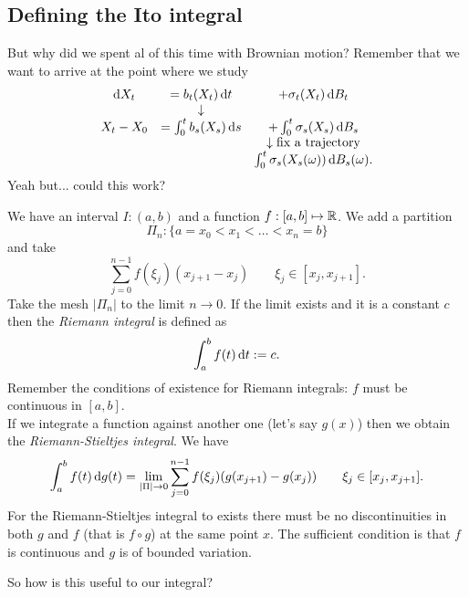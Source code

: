 \documentclass[crop=false, class=article]{standalone}
\begin{document}
\subsection{Defining the Ito integral}
But why did we spent al of this time with Brownian motion? Remember that we want to arrive at the point where we study
\begin{equation*}
	\begin{array}{ccc}
		\mathop{}\!\mathrm{d} X_{t}&=b_{t}(X_{t})\mathop{}\!\mathrm{d} t&+\sigma_{t}(X_{t})\mathop{}\!\mathrm{d} B_{t}\\
		&\downarrow&\\
		X_{t}-X_{0}&=\int_{0}^{t}b_{s}(X_{s})\mathop{}\!\mathrm{d} s&+\int_{0}^{t}\sigma_{s}(X_{s})\mathop{}\!\mathrm{d} B_{s}\\
		&&\downarrow\text{fix a trajectory}\\
		&&\int_{0}^{t}\sigma_{s}(X_{s}(\omega))\mathop{}\!\mathrm{d} B_{s}(\omega).
	\end{array}
\end{equation*}
Yeah but... could this work?
\begin{revise}
	We have an interval $I:(a,b)$ and a function $f:[a,b]\mapsto\mathbb{R}$. We add a partition
	\begin{equation*}
		\Pi_{n}:\{a=x_{0}<x_{1}<\ldots<x_{n}=b\}
	\end{equation*}
	and take
	\begin{equation*}
		\sum_{j=0}^{n-1}f(\xi_j)(x_{j+1}-x_{j})\qquad\xi_{j}\in[x_{j},x_{j+1}].
	\end{equation*}
	Take the mesh $|\Pi_{n}|$ to the limit $n\to0$. If the limit exists and it is a constant $c$ then the \emph{Riemann integral} is defined as
	\begin{equation*}
		\int_{a}^{b}f(t)\mathop{}\!\mathrm{d} t:=c.
	\end{equation*}
	Remember the conditions of existence for Riemann integrals: $f$ must be continuous in $[a,b]$. \\
	If we integrate a function against another one (let's say $g(x)$) then we obtain the \emph{Riemann-Stieltjes integral}. We have
	\begin{equation*}
		\int_{a}^{b}f(t)\mathop{}\!\mathrm{d} g(t)=\lim_{|\Pi|\to 0}\sum_{j=0}^{n-1}f(\xi_j)(g(x_{j+1})-g(x_{j}))\qquad\xi_j\in[x_{j},x_{j+1}].
	\end{equation*}
	For the Riemann-Stieltjes integral to exists there must be no discontinuities in both $g$ and $f$ (that is $f\circ g$) at the same point $x$. The sufficient condition is that $f$ is continuous and $g$ is of bounded variation.
\end{revise}
So how is this useful to our integral?
\end{document}
